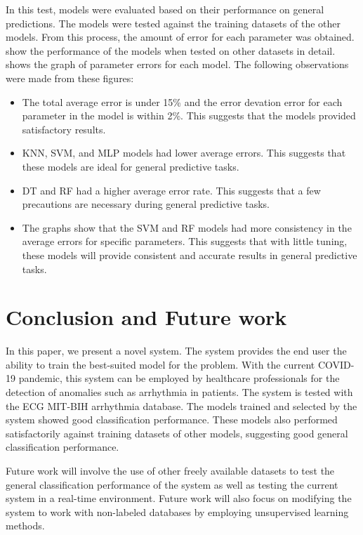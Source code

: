 \documentclass[a4paper,fleqn]{cas-dc}
\begin{document}
In this test, models were evaluated based on their performance on general predictions. The models were tested against the training datasets of the other models. From this process, the amount of error for each parameter was obtained.  show the performance of the models when tested on other datasets in detail.  shows the graph of parameter errors for each model. The following observations were made from these figures:

\begin{itemize}
    \item The total average error is under 15\% and the error devation error for each parameter in the model is within 2\%. This suggests that the models provided satisfactory results.
    \item KNN, SVM, and MLP models had lower average errors. This suggests that these models are ideal for general predictive tasks.
    \item DT and RF had a higher average error rate. This suggests that a few precautions are necessary during general predictive tasks.
    \item The graphs show that the SVM and RF models had more consistency in the average errors for specific parameters. This suggests that with little tuning, these models will provide consistent and accurate results in general predictive tasks.
\end{itemize}

\FloatBarrier
\section{Conclusion and Future work} \label{sec:conclusion_and_future_work}
In this paper, we present a novel system. The system provides the end user the ability to train the best-suited model for the problem. With the current COVID-19 pandemic, this system can be employed by healthcare professionals for the detection of anomalies such as arrhythmia in patients. The system is tested with the ECG MIT-BIH arrhythmia database. The models trained and selected by the system showed good classification performance. These models also performed satisfactorily against training datasets of other models, suggesting good general classification performance.

Future work will involve the use of other freely available datasets to test the general classification performance of the system as well as testing the current system in a real-time environment. Future work will also focus on modifying the system to work with non-labeled databases by employing unsupervised learning methods.
\end{document}
